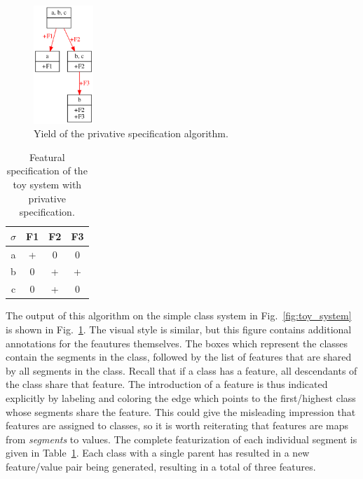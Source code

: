 \documentclass[12pt, oneside]{article}   	%
\begin{document}
\begin{figure}[htb!]
	\centering
	\includegraphics[width=0.2\textwidth]{toy_system_privative_features.png}
	\caption{Yield of the privative specification algorithm.}
	\label{fig:toy_system_privative_features}
\end{figure}

\begin{table}[h]
	\centering
	\begin{tabular} {|c||c|c|c|}
		\hline
		$\sigma$ & F1 & F2 & F3 \\ \hline
		a & + & 0 & 0 \\
		b & 0 & + & + \\
		c & 0 & + & 0  \\
		\hline
	\end{tabular}
	\caption{Featural specification of the toy system with privative specification.}
	\label{table:toy_system_privative}
\end{table}

The output of this algorithm on the simple class system in Fig.~\ref{fig:toy_system} is shown in Fig.~\ref{fig:toy_system_privative_features}. The visual style is similar, but this figure contains additional annotations for the feautures themselves. The boxes which represent the classes contain the segments in the class, followed by the list of features that are shared by all segments in the class. Recall that if a class has a feature, all descendants of the class share that feature. The introduction of a feature is thus indicated explicitly by labeling and coloring the edge which points to the first/highest class whose segments share the feature. This could give the misleading impression that features are assigned to classes, so it is worth reiterating that features are maps from \textit{segments} to values. The complete featurization of each individual segment is given in Table~\ref{table:toy_system_privative}. Each class with a single parent has resulted in a new feature/value pair being generated, resulting in a total of three features.
\end{document}
